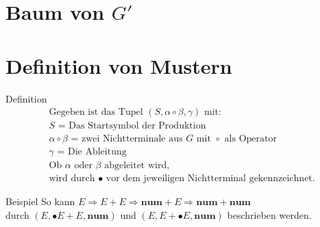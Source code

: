 \documentclass[t]{beamer}
\begin{document}
	\section{Baum von $G'$}\label{sec:baum-von-$g'$}
	\begin{frame}

	\end{frame}


	\section{Definition von Mustern}\label{sec:muster}
	\begin{frame}
		\begin{block}{Definition\cite{softwarelanguage}}
			\vspace{-1em}
			\begin{align*}
				&\text{Gegeben ist das Tupel } (S, \alpha \circ \beta, \gamma) \text{ mit:} \\
				&S \text{ = Das Startsymbol der Produktion} \\
				&\alpha \circ \beta \text{ = zwei Nichtterminale aus } G \text{ mit } \circ \text{ als Operator} \\
				&\gamma \text{ = Die Ableitung} \\
				&\text{Ob } \alpha \text{ oder } \beta \text{ abgeleitet wird,} \\
				&\text{wird durch } \bullet \text{ vor dem jeweiligen Nichtterminal gekennzeichnet.}
			\end{align*}
		\end{block}
		\bigskip
		\begin{exampleblock}{Beispiel}
			So kann $E \Rightarrow E + E \Rightarrow \mathbf{num} + E \Rightarrow \mathbf{num} + \mathbf{num}$ \\ durch
			$(E, \bullet{E}+E, \mathbf{num})$ und $(E, E+\bullet{E}, \mathbf{num})$ beschrieben werden.
		\end{exampleblock}
	\end{frame}
\end{document}
